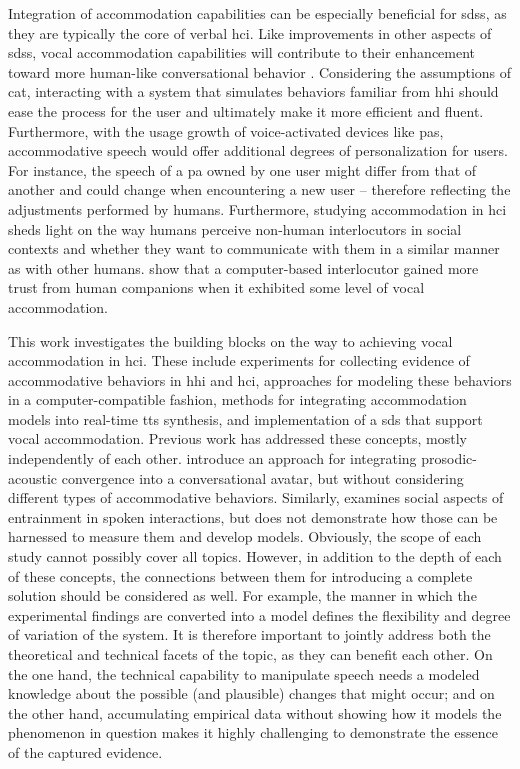 Integration of accommodation capabilities can be especially beneficial for \aclp{sds}, as they are typically the core of verbal \acl{hci}.
Like improvements in other aspects of \aclp{sds}, vocal accommodation capabilities will contribute to their enhancement toward more human-like conversational behavior \citep{Weise2017towards}.
Considering the assumptions of \acl{cat}, interacting with a system that simulates behaviors familiar from \acl{hhi} should ease the process for the user and ultimately make it more efficient and fluent.
Furthermore, with the usage growth of voice-activated devices like \aclp{pa}, accommodative speech would offer additional degrees of personalization for users.
For instance, the speech of a \acl{pa} owned by one user might differ from that of another and could change when encountering a new user -- therefore reflecting the adjustments performed by humans.
Furthermore, studying accommodation in \acl{hci} sheds light on the way humans perceive non-human interlocutors in social contexts and whether they want to communicate with them in a similar manner as with other humans.
\citet{Benus2018prosodic} show that a computer-based interlocutor gained more trust from human companions when it exhibited some level of vocal accommodation.

This work investigates the building blocks on the way to achieving vocal accommodation in \acl{hci}.
These include experiments for collecting evidence of accommodative behaviors in \acl{hhi} and \acl{hci}, approaches for modeling these behaviors in a computer-compatible fashion, methods for integrating accommodation models into real-time \acl{tts} synthesis, and implementation of a \acl{sds} that support vocal accommodation.
Previous work has addressed these concepts, mostly independently of each other.
\citet{Levitan2016implementing} introduce an approach for integrating prosodic-acoustic convergence into a conversational avatar, but without considering different types of accommodative behaviors.
Similarly, \citet{Bevnuvs2014social} examines social aspects of entrainment in spoken interactions, but does not demonstrate how those can be harnessed to measure them and develop models.
Obviously, the scope of each study cannot possibly cover all topics.
However, in addition to the depth of each of these concepts, the connections between them for introducing a complete solution should be considered as well.
For example, the manner in which the experimental findings are converted into a model defines the flexibility and degree of variation of the system.
It is therefore important to jointly address both the theoretical and technical facets of the topic, as they can benefit each other.
On the one hand, the technical capability to manipulate speech needs a modeled knowledge about the possible (and plausible) changes that might occur; and on the other hand, accumulating empirical data without showing how it models the phenomenon in question makes it highly challenging to demonstrate the essence of the captured evidence.

